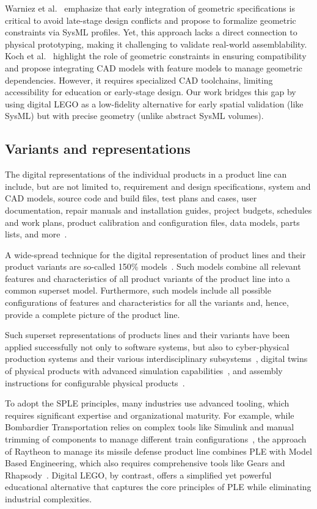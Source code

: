 \documentclass[sigconf,review]{acmart}
\begin{document}
Warniez et al.~\cite{Warniez_2014} emphasize that early integration of geometric specifications is critical to avoid late-stage design conflicts and propose to formalize geometric constraints via SysML profiles. 
Yet, this approach lacks a direct connection to physical prototyping, making it challenging to validate real-world assemblability.
Koch et al.~\cite{Koch_2016} highlight the role of geometric constraints in ensuring compatibility and propose integrating CAD models with feature models to manage geometric dependencies. 
However, it requires specialized CAD toolchains, limiting accessibility for education or early-stage design. 
Our work bridges this gap by using digital LEGO as a low-fidelity alternative for early spatial validation (like SysML) but with precise geometry (unlike abstract SysML volumes).


\subsection{Variants and representations}
\label{sec:variants}

The digital representations of the individual products in a product line can include, but are not limited to, requirement and design specifications, system and CAD models, source code and build files, test plans and cases, user documentation, repair manuals and installation guides, project budgets, schedules and work plans, product calibration and configuration files, data models, parts lists, and more~\cite{Clements_2015}. 

A wide-spread technique for the digital representation of product lines and their product variants are so-called 150\% models~\cite{Clements_2015}.
Such models combine all relevant features and characteristics of all product variants of the product line into a common superset model.
Furthermore, such models include all possible configurations of features and characteristics for all the variants and, hence, provide a complete picture of the product line.

Such superset representations of products lines and their variants have been applied successfully not only to software systems, but also to cyber-physical production systems and their various interdisciplinary subsystems~\cite{Fadhlillah_2023}, digital twins of physical products with advanced simulation capabilities~\cite{Wagner_2024}, and assembly instructions for configurable physical products~\cite{Zogopoulos_2024}.

To adopt the SPLE principles, many industries use advanced tooling, which requires significant expertise and organizational maturity. 
For example, while Bombardier Transportation relies on complex tools like Simulink and manual trimming of components to manage different train configurations~\cite{Abbas_2020}, the approach of Raytheon to manage its missile defense product line combines PLE with Model Based Engineering, which also requires comprehensive tools like Gears and Rhapsody~\cite{Young_2019}. 
Digital LEGO, by contrast, offers a simplified yet powerful educational alternative that captures the core principles of PLE while eliminating industrial complexities.
\end{document}
